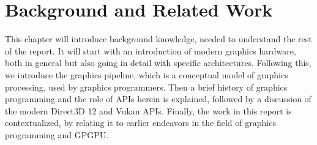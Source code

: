 \chapter{Background and Related Work}\label{ch:background_and_related_work}
This chapter will introduce background knowledge, needed to understand the rest of the report. 
It will start with an introduction of modern graphics hardware, both in general but also going in detail with specific architectures.
Following this, we introduce the graphics pipeline, which is a conceptual model of graphics processing, used by graphics programmers. 
Then a brief history of graphics programming and the role of \glspl{API} herein is explained, followed by a discussion of the modern Direct3D 12 and Vukan \glspl{API}.
Finally, the work in this report is contextualized, by relating it to earlier endeavors in the field of graphics programming and \gls{GPGPU}.







